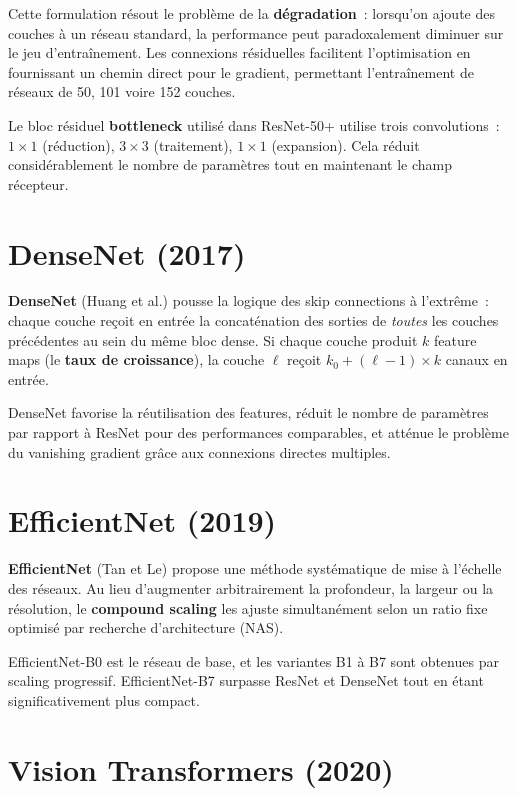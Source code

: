 \documentclass[a4paper,11pt,twoside]{book}
\begin{document}
Cette formulation résout le problème de la \textbf{dégradation}~: lorsqu'on ajoute des couches à un réseau standard, la performance peut paradoxalement diminuer sur le jeu d'entraînement. Les connexions résiduelles facilitent l'optimisation en fournissant un chemin direct pour le gradient, permettant l'entraînement de réseaux de 50, 101 voire 152 couches.

Le bloc résiduel \textbf{bottleneck} utilisé dans ResNet-50+ utilise trois convolutions~: $1 \times 1$ (réduction), $3 \times 3$ (traitement), $1 \times 1$ (expansion). Cela réduit considérablement le nombre de paramètres tout en maintenant le champ récepteur.

\section{DenseNet (2017)}

\textbf{DenseNet} (Huang et al.) pousse la logique des skip connections à l'extrême~: chaque couche reçoit en entrée la concaténation des sorties de \emph{toutes} les couches précédentes au sein du même bloc dense. Si chaque couche produit $k$ feature maps (le \textbf{taux de croissance}), la couche $\ell$ reçoit $k_0 + (\ell-1) \times k$ canaux en entrée.

DenseNet favorise la réutilisation des features, réduit le nombre de paramètres par rapport à ResNet pour des performances comparables, et atténue le problème du vanishing gradient grâce aux connexions directes multiples.

\section{EfficientNet (2019)}

\textbf{EfficientNet} (Tan et Le) propose une méthode systématique de mise à l'échelle des réseaux. Au lieu d'augmenter arbitrairement la profondeur, la largeur ou la résolution, le \textbf{compound scaling} les ajuste simultanément selon un ratio fixe optimisé par recherche d'architecture (NAS).

EfficientNet-B0 est le réseau de base, et les variantes B1 à B7 sont obtenues par scaling progressif. EfficientNet-B7 surpasse ResNet et DenseNet tout en étant significativement plus compact.

\section{Vision Transformers (2020)}
\end{document}
